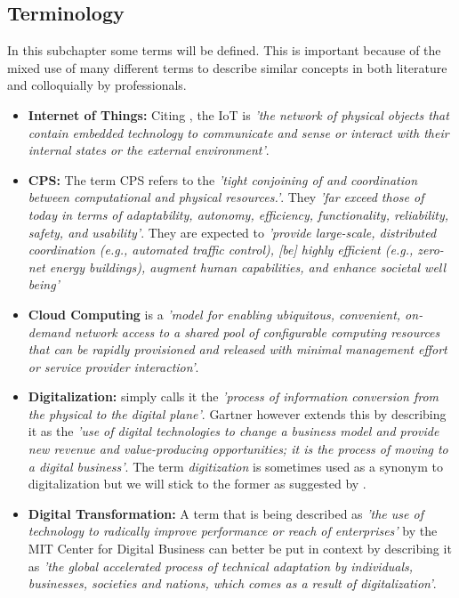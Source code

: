 \subsection{Terminology}
In this subchapter some terms will be defined. This is important because of the mixed use of many different terms to describe similar concepts in both literature and colloquially by professionals.

\begin{itemize}

\item \textbf{Internet of Things:} Citing \citeauthor{iot-def:2016}, the \ac{IoT} is \emph{'the network of physical objects that contain embedded technology to communicate and sense or interact with their internal states or the external environment'}.
  
  
  \item \textbf{\acl{CPS}:} The term \ac{CPS} refers to the \emph{'tight conjoining of and coordination between computational and physical resources.'}. They \emph{'far exceed those of today in terms of adaptability, autonomy, efficiency, functionality, reliability, safety, and usability'}. They are expected to \emph{'provide large-scale, distributed coordination (e.g., automated traffic control), [be] highly efficient (e.g., zero-net energy buildings), augment human capabilities, and enhance societal well being'}  \cite{cps:nsf:2011}
  
  \item \textbf{Cloud Computing} is a \emph{'model for enabling ubiquitous, convenient, on-demand network access to a shared pool of configurable computing resources that can be rapidly provisioned and released with minimal management effort or service provider interaction'}\cite{Mell:2011:SND:2206223}.
  
  \item \textbf{Digitalization:} \citeauthor{khan-digital:2016} simply calls it the \emph{'process of information conversion from the physical to the digital plane'}. Gartner however extends this by describing it as the \emph{'use of digital technologies to change a business model and provide new revenue and value-producing opportunities; it is the process of moving to a digital business'}. The term \emph{digitization} is sometimes used as a synonym to digitalization but we will stick to the former as suggested by \citeauthor{khan-digital:2016}.
  
  \item \textbf{Digital Transformation:} A term that is being described as \emph{'the use of technology to radically improve performance or reach of enterprises'}\cite{westerman2011digital} by the MIT Center for Digital Business can better be put in context by describing it as \emph{'the global accelerated process of technical adaptation by individuals, businesses, societies and nations, which comes as a result of digitalization'}\cite{bonnect2014leading,khan-digital:2016}.
  

\end{itemize}

